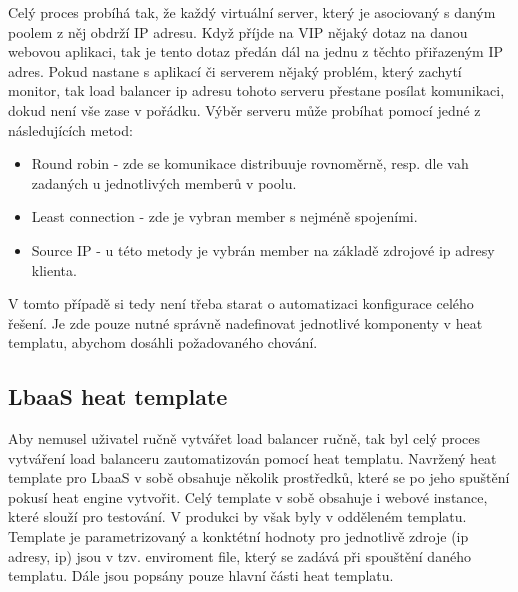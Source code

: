 Celý proces probíhá tak, že každý virtuální server, který je asociovaný s daným poolem z něj obdrží IP adresu. Když příjde na VIP nějaký dotaz na danou webovou aplikaci, tak je tento dotaz předán dál na jednu z těchto přiřazeným IP adres. Pokud nastane s aplikací či serverem nějaký problém, který zachytí monitor, tak load balancer ip adresu tohoto serveru přestane posílat komunikaci, dokud není vše zase v pořádku. Výběr serveru může probíhat pomocí jedné z následujících metod:

\begin{itemize}
\item Round robin - zde se komunikace distribuuje rovnoměrně, resp. dle vah zadaných u jednotlivých memberů v poolu.
\item Least connection - zde je vybran member s nejméně spojeními.
\item Source IP - u této metody je vybrán member na základě zdrojové ip adresy klienta.
\end{itemize}

V tomto případě si tedy není třeba starat o automatizaci konfigurace celého řešení. Je zde pouze nutné správně nadefinovat jednotlivé komponenty v heat templatu, abychom dosáhli požadovaného chování.

\subsection{LbaaS heat template}

Aby nemusel uživatel ručně vytvářet load balancer ručně, tak byl celý proces vytváření load balanceru zautomatizován pomocí heat templatu. Navržený heat template pro LbaaS v sobě obsahuje několik  prostředků, které se po jeho spuštění pokusí heat engine vytvořit. Celý template v sobě obsahuje i webové instance, které slouží pro testování. V produkci by však byly v odděleném templatu. Template je parametrizovaný a konktétní hodnoty pro jednotlivě zdroje (ip adresy, ip) jsou v tzv. enviroment file, který se zadává při spouštění daného templatu. Dále jsou popsány pouze hlavní části heat templatu.

